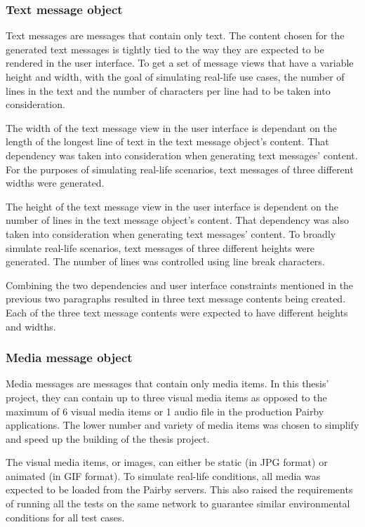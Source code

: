 \documentclass[a4paper,12pt]{article}
\begin{document}
\subsubsection{Text message object}
\label{subsec:text-message-object}
Text messages are messages that contain only text. The content chosen for the generated text messages is tightly tied to the way they are expected to be rendered in the user interface. To get a set of message views that have a variable height and width, with the goal of simulating real-life use cases, the number of lines in the text and the number of characters per line had to be taken into consideration.

The width of the text message view in the user interface is dependant on the length of the longest line of text in the text message object's content. That dependency was taken into consideration when generating text messages' content. For the purposes of simulating real-life scenarios, text messages of three different widths were generated.

The height of the text message view in the user interface is dependent on the number of lines in the text message object's content. That dependency was also taken into consideration when generating text messages' content. To broadly simulate real-life scenarios, text messages of three different heights were generated. The number of lines was controlled using line break characters.

Combining the two dependencies and user interface constraints mentioned in the previous two paragraphs resulted in three text message contents being created. Each of the three text message contents were expected to have different heights and widths.

\subsubsection{Media message object}
\label{subsec:media-message-object}
Media messages are messages that contain only media items. In this thesis' project, they can contain up to three visual media items as opposed to the maximum of 6 visual media items or 1 audio file in the production Pairby applications. The lower number and variety of media items was chosen to simplify and speed up the building of the thesis project.

The visual media items, or images, can either be static (in JPG format) or animated (in GIF format). To simulate real-life conditions, all media was expected to be loaded from the Pairby servers. This also raised the requirements of running all the tests on the same network to guarantee similar environmental conditions for all test cases.
\end{document}
